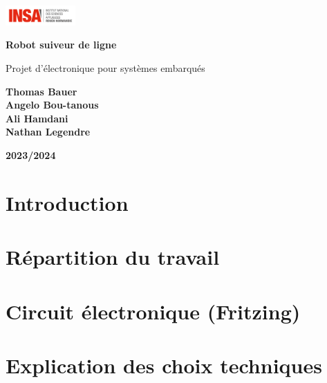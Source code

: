 \documentclass[12pt]{article}
\begin{document}
\begin{titlepage}
    \centering
    
    \includegraphics[width=0.2\textwidth]{images/logo-insa.png}\par\vspace{1cm}
    
    {\LARGE\bfseries Robot suiveur de ligne\par}
    
    {\Large Projet d'électronique pour systèmes embarqués\par}
    
    \vspace{2cm}
    
    \vfill
    \begin{flushleft}
        \textbf{Thomas Bauer}\\
        \textbf{Angelo Bou-tanous}\\
        \textbf{Ali Hamdani}\\
        \textbf{Nathan Legendre}
    \end{flushleft}
        \vfill
    \begin{flushright}
        \textbf{2023/2024}
    \end{flushright}
    
\end{titlepage}

\newpage

\section*{Introduction}


\section{Répartition du travail}


\section{Circuit électronique (Fritzing)}


\section{Explication des choix techniques}

\end{document}
